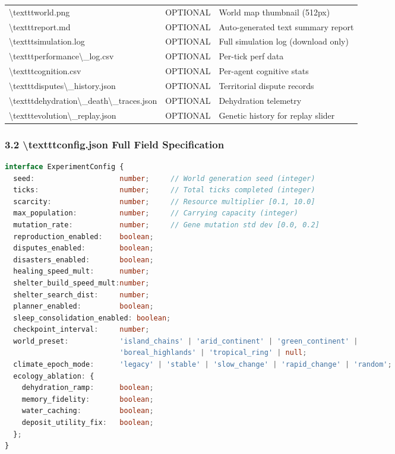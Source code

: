 \documentclass[11pt,a4paper]{article}
\begin{document}
\begin{longtable}{lll}
\textbackslash{}texttt{world.png} & OPTIONAL & World map thumbnail (512px) \\
\textbackslash{}texttt{report.md} & OPTIONAL & Auto-generated text summary report \\
\textbackslash{}texttt{simulation.log} & OPTIONAL & Full simulation log (download only) \\
\textbackslash{}texttt{performance\textbackslash{}\_log.csv} & OPTIONAL & Per-tick perf data \\
\textbackslash{}texttt{cognition.csv} & OPTIONAL & Per-agent cognitive stats \\
\textbackslash{}texttt{disputes\textbackslash{}\_history.json} & OPTIONAL & Territorial dispute records \\
\textbackslash{}texttt{dehydration\textbackslash{}\_death\textbackslash{}\_traces.json} & OPTIONAL & Dehydration telemetry \\
\textbackslash{}texttt{evolution\textbackslash{}\_replay.json} & OPTIONAL & Genetic history for replay slider \\
\bottomrule
\end{longtable}

\subsubsection*{3.2 \textbackslash{}texttt{config.json}  Full Field Specification}

\begin{lstlisting}[language=typescript]
interface ExperimentConfig {
  seed:                    number;     // World generation seed (integer)
  ticks:                   number;     // Total ticks completed (integer)
  scarcity:                number;     // Resource multiplier [0.1, 10.0]
  max_population:          number;     // Carrying capacity (integer)
  mutation_rate:           number;     // Gene mutation std dev [0.0, 0.2]
  reproduction_enabled:    boolean;
  disputes_enabled:        boolean;
  disasters_enabled:       boolean;
  healing_speed_mult:      number;
  shelter_build_speed_mult:number;
  shelter_search_dist:     number;
  planner_enabled:         boolean;
  sleep_consolidation_enabled: boolean;
  checkpoint_interval:     number;
  world_preset:            'island_chains' | 'arid_continent' | 'green_continent' |
                           'boreal_highlands' | 'tropical_ring' | null;
  climate_epoch_mode:      'legacy' | 'stable' | 'slow_change' | 'rapid_change' | 'random';
  ecology_ablation: {
    dehydration_ramp:      boolean;
    memory_fidelity:       boolean;
    water_caching:         boolean;
    deposit_utility_fix:   boolean;
  };
}
\end{lstlisting}
\end{document}
